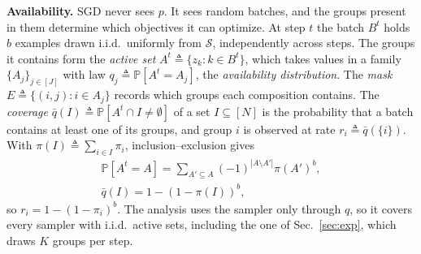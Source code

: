 \documentclass{article}
\theoremstyle{definition}
\newcommand{\PP}{\mathbb{P}}
\newcommand{\Nn}[1]{[#1]}
\begin{document}
\noindent\textbf{Availability.} SGD never sees $p$. It sees random
batches, and the groups present in them determine which objectives it can
optimize. At step $t$ the batch $B^t$ holds $b$ examples drawn i.i.d.\
uniformly from $\mathcal{S}$, independently across steps. The groups it
contains form the \emph{active set} $A^t\triangleq\{z_k:k\in B^t\}$, which
takes values in a family $\{A_j\}_{j\in\Nn{J}}$ with law
$q_j\triangleq\PP[A^t=A_j]$, the \emph{availability distribution}. The
\emph{mask} $E\triangleq\{(i,j):i\in A_j\}$ records which groups each
composition contains. The \emph{coverage}
$\bar q(I)\triangleq\PP[A^t\cap I\neq\emptyset]$ of a set
$I\subseteq\Nn{N}$ is the probability that a batch contains at least one
of its groups, and group $i$ is observed at rate
$r_i\triangleq\bar q(\{i\})$. With $\pi(I)\triangleq\sum_{i\in I}\pi_i$,
inclusion--exclusion gives
\begin{multline}
\PP[A^t\!=\!A]=\textstyle\sum_{A'\subseteq A}(-1)^{|A\setminus A'|}\pi(A')^b,
\\ \bar q(I)=1-(1-\pi(I))^b,
\label{eq:iidlaw}
\end{multline}
so $r_i=1-(1-\pi_i)^b$. The analysis uses the sampler only through $q$,
so it covers every sampler with i.i.d.\ active sets, including the one of
Sec.~\ref{sec:exp}, which draws $K$ groups per step.
\end{document}
